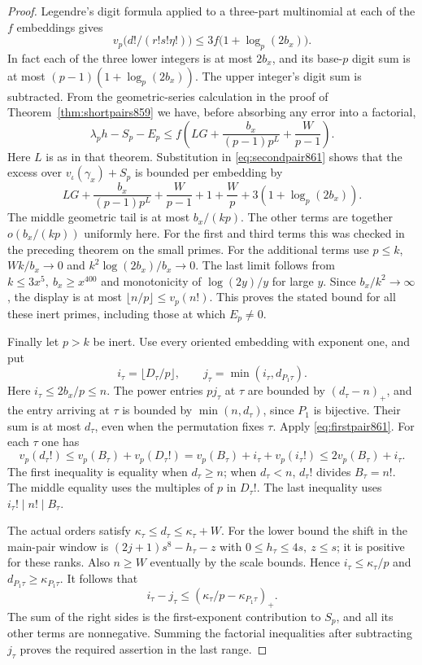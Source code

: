 \documentclass[a4paper,11pt]{article}
\theoremstyle{definition}
\theoremstyle{remark}
\numberwithin{equation}{section}
\begin{document}
\begin{proof}
Legendre's digit formula applied to a three-part multinomial
at each of the \(f\) embeddings gives
\[
           v_p\bigl(d!/(r!s!\eta!)\bigr)
                  \le 3f\bigl(1+\log_p(2b_x)\bigr).
\]
In fact each of the three lower integers is at most \(2b_x\),
and its base-\(p\) digit sum is at most
\((p-1)(1+\log_p(2b_x))\). The upper integer's digit sum is
subtracted. From the geometric-series calculation in the
proof of Theorem~\ref{thm:shortpairs859} we have, before
absorbing any error into a factorial,
\[
  \lambda_p h-S_p-E_p\le f\left(LG+
          \frac{b_x}{(p-1)p^L}+\frac{W}{p-1}\right).
\]
Here \(L\) is as in that theorem. Substitution in
\eqref{eq:secondpair861} shows that the excess over
\(v_\iota(\gamma_x)+S_p\) is bounded per embedding by
\[
    LG+\frac{b_x}{(p-1)p^L}+\frac W{p-1}
                         +1+\frac Wp+3(1+\log_p(2b_x)).
\]
The middle geometric tail is at most \(b_x/(kp)\). The other
terms are together \(o(b_x/(kp))\) uniformly here. For the
first and third terms this was checked in the preceding
theorem on the small primes. For the additional terms use
\(p\le k\), \(Wk/b_x\to0\) and \(k^2\log(2b_x)/b_x\to0\).
The last limit follows from \(k\le3x^5,\ b_x\ge x^{400}\)
and monotonicity of \(\log(2y)/y\) for large \(y\).
Since \(b_x/k^2\to\infty\), the display is at most
\(\lfloor n/p\rfloor\le v_p(n!)\). This proves the stated
bound for all these inert primes, including those at which
\(E_p\ne0\).

Finally let \(p>k\) be inert. Use every oriented embedding
with exponent one, and put
\[
        i_\tau=\lfloor D_\tau/p\rfloor,\qquad
        j_\tau=\min(i_\tau,d_{P_1\tau}).
\]
Here \(i_\tau\le 2b_x/p\le n\). The power entries
\(p j_\tau\) at \(\tau\) are bounded by \((d_\tau-n)_+\),
and the entry arriving at \(\tau\) is bounded by
\(\min(n,d_\tau)\), since \(P_1\) is bijective. Their sum is
at most \(d_\tau\), even when the permutation fixes \(\tau\).
Apply \eqref{eq:firstpair861}. For each \(\tau\) one has
\[
    v_p(d_\tau!)\le v_p(B_\tau)+v_p(D_\tau!)
       =v_p(B_\tau)+i_\tau+v_p(i_\tau!)
       \le 2v_p(B_\tau)+i_\tau .
\]
The first inequality is equality when \(d_\tau\ge n\);
when \(d_\tau<n\), \(d_\tau!\) divides \(B_\tau=n!\).
The middle equality uses the multiples of \(p\) in \(D_\tau!\).
The last inequality uses \(i_\tau!\mid n!\mid B_\tau\).

The actual orders satisfy
\(\kappa_\tau\le d_\tau\le\kappa_\tau+W\).
For the lower bound the shift in the main-pair window is
\((2j+1)s^8-h_\tau-z\) with \(0\le h_\tau\le4s,\ z\le s\);
it is positive for these ranks. Also \(n\ge W\) eventually
by the scale bounds. Hence \(i_\tau\le\kappa_\tau/p\) and
\(d_{P_1\tau}\ge\kappa_{P_1\tau}\). It follows that
\[
        i_\tau-j_\tau
                  \le(\kappa_\tau/p-\kappa_{P_1\tau})_+ .
\]
The sum of the right sides is the first-exponent contribution
to \(S_p\), and all its other terms are nonnegative.
Summing the factorial inequalities after subtracting \(j_\tau\)
proves the required assertion in the last range.
\end{proof}
\end{document}
